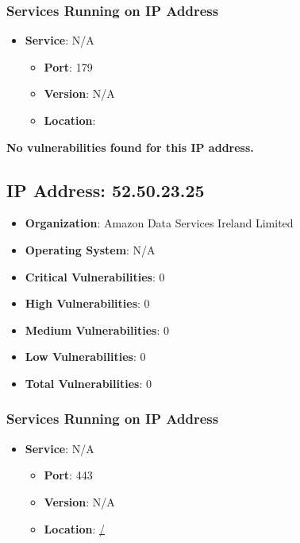 \documentclass{article}
\begin{document}
\subsubsection*{Services Running on IP Address}

\begin{itemize}
    
        \item \textbf{Service}: N/A
        \begin{itemize}
            \item \textbf{Port}: 179
            \item \textbf{Version}:  N/A 
            \item \textbf{Location}: \href{  }{  }
        \end{itemize}
    
\end{itemize}


\textbf{No vulnerabilities found for this IP address.}




\clearpage



\subsection*{IP Address: 52.50.23.25}

\begin{itemize}
    \item \textbf{Organization}: Amazon Data Services Ireland Limited
    \item \textbf{Operating System}:  N/A 
    \item \textbf{Critical Vulnerabilities}: 0
    \item \textbf{High Vulnerabilities}: 0
    \item \textbf{Medium Vulnerabilities}: 0
    \item \textbf{Low Vulnerabilities}: 0
    \item \textbf{Total Vulnerabilities}: 0
\end{itemize}

\subsubsection*{Services Running on IP Address}

\begin{itemize}
    
        \item \textbf{Service}: N/A
        \begin{itemize}
            \item \textbf{Port}: 443
            \item \textbf{Version}:  N/A 
            \item \textbf{Location}: \href{ / }{ / }
        \end{itemize}
    
\end{itemize}
\end{document}
